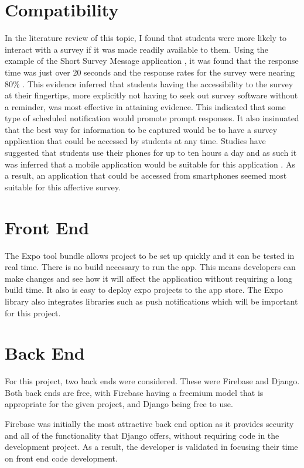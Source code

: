 \documentclass{l4proj}
\begin{document}
\section{Compatibility}
In the literature review of this topic, I found that students were more likely to interact with a survey if it was made readily available to them. Using the example of the Short Survey Message application \citep{lishinski_short_2020}, it was found that the response time was just over 20 seconds and the response rates for the survey were nearing 80\% \citep{lishinski_experience_2020}. This evidence inferred that students having the accessibility to the survey at their fingertips, more explicitly not having to seek out survey software without a reminder, was most effective in attaining evidence. This indicated that some type of scheduled notification would promote prompt responses. It also insinuated that the best way for information to be captured would be to have a survey application that could be accessed by students at any time. Studies have suggested that students use their phones for up to ten hours a day and as such it was inferred that a mobile application would be suitable for this application \citep{noauthor_college_2014}. As a result, an application that could be accessed from smartphones seemed most suitable for this affective survey. 

\section{Front End}
The Expo tool bundle allows project to be set up quickly and it can be tested in real time. There is no build necessary to run the app. This means developers can make changes and see how it will affect the application without requiring a long build time. It also is easy to deploy expo projects to the app store. The Expo library also integrates libraries such as push notifications which will be important for this project. 
\section{Back End}
For this project, two back ends were considered. These were Firebase and Django. Both back ends are free, with Firebase having a freemium model that is appropriate for the given project, and Django being free to use.

Firebase was initially the most attractive back end option as it provides security and all of the functionality that Django offers, without requiring code in the development project. As a result, the developer is validated in focusing their time on front end code development.
\end{document}
